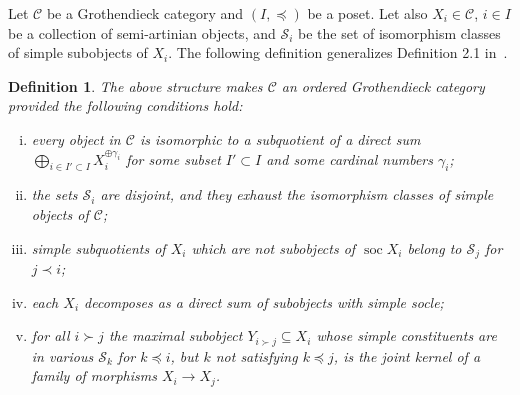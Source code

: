 \documentclass[11pt]{article}
\theoremstyle{plain}
\theoremstyle{nonumberplain}
\theoremstyle{plain}
\newtheorem{definition}[lemma]{Definition}
\newtheorem{remark}[lemma]{Remark}
\theoremstyle{nonumberplain}
\newcommand\cC{\mathcal C}
\newcommand\cS{\mathcal S}
\DeclareMathOperator{\soc}{\mathrm{soc}}
\DeclareMathOperator{\op}{\mathrm{op}}
\begin{document}
Let $\cC$ be a Grothendieck category and $(I,{{\preceq}})$ be a poset. Let also $X_i\in \cC$, $i\in I$ be a collection of semi-artinian objects, and $\cS_i$ be the set of isomorphism classes of simple subobjects of $X_i$.
{The} following definition generalizes Definition 2.1 in~\cite{us2}.
\begin{definition}\label{def.ordered}
  The above structure makes $\cC$ an {\it ordered Grothendieck
    category} provided the following conditions hold{{:}}
  \begin{enumerate}[(i)]
  \item every object in $\cC$ is isomorphic to a subquotient of a
    {direct} sum
    $\bigoplus\limits_{ i \in I'\subset I}X_i^{\oplus \gamma_i}$ {for
      some subset $I'\subset I$ and some cardinal numbers $\gamma_i$};
  \item the sets $\cS_i$ are disjoint, and they exhaust the
    isomorphism classes of simple objects of $\cC$;
    \item simple subquotients of $X_i$ which are not subobjects of $\soc X_i$ belong to $\cS_j$ for $j\prec i$;
    \item each $X_i$ decomposes as a direct sum of subobjects with simple socle;
    \item for all $i{{\succ}}j$ the maximal subobject
      $Y_{i{{\succ}}j}\subseteq X_i$ whose simple constituents are in
      various $\cS_k$ {for} $k\preceq i$, but $k$ not satisfying $k\preceq j$, is the joint
      kernel of a family of morphisms $X_i\to X_j$.
  \end{enumerate}
\end{definition}
\end{document}
